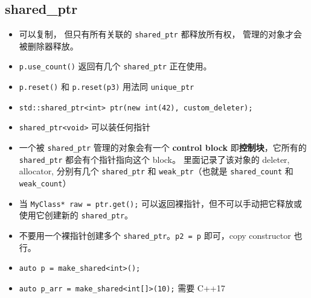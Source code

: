 \subsection{shared\_ptr}
\begin{itemize}
\item 可以复制， 但只有所有关联的 \verb`shared_ptr` 都释放所有权， 管理的对象才会被删除器释放。
\item \verb`p.use_count()` 返回有几个 \verb`shared_ptr` 正在使用。
\item \verb`p.reset()` 和 \verb`p.reset(p3)` 用法同 \verb`unique_ptr`
\item \verb`std::shared_ptr<int> ptr(new int(42), custom_deleter);`
\item \verb`shared_ptr<void>` 可以装任何指针
\item 一个被 \verb`shared_ptr` 管理的对象会有一个 \textbf{control block} 即\textbf{控制块}，它所有的 \verb`shared_ptr` 都会有个指针指向这个 block。 里面记录了该对象的 deleter, allocator, 分别有几个 \verb`shared_ptr` 和 \verb`weak_ptr`（也就是 \verb`shared_count` 和 \verb`weak_count`）
\item 当 \verb`MyClass* raw = ptr.get();` 可以返回裸指针，但不可以手动把它释放或使用它创建新的 \verb`shared_ptr`。
\item 不要用一个裸指针创建多个 \verb`shared_ptr`。\verb`p2 = p` 即可，copy constructor 也行。
\item \verb`auto p = make_shared<int>();`
\item \verb`auto p_arr = make_shared<int[]>(10);` 需要 C++17
\end{itemize}

